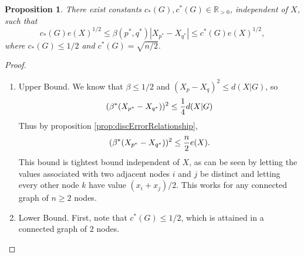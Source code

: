 \documentclass{article}
\newtheorem{proposition}{Proposition}
\theoremstyle{remark}
\newcommand{\R}[0]{\mathbb{R}}
\begin{document}
\begin{proposition}{\label{proposition:errorUpdateEquivalence}}
        There exist constants $c_*(G),c^*(G)\in\R_{>0}$, independent of $X$, such that
        \begin{equation}
		c_*(G)e(X)^{1/2} \leq \beta(p^*,q^*)|X_{p^*}-X_{q^*}| \leq c^*(G)e(X)^{1/2},
        \end{equation}
where $c_*(G)\leq1/2$ and  $c^*(G) = \sqrt{n/2}$.
\end{proposition}
\begin{proof}
        \begin{enumerate}
                \item Upper Bound. We know that $\beta\leq1/2$ and $(X_p-X_q)^2 \leq d(X|G)$, so
                        \begin{equation}{\label{eq:updateSizeBound1}}
                                (\beta^*(X_{p^*}-X_{q^*}))^2\leq \frac{1}{4}d(X|G)
                        \end{equation}
                        Thus by proposition \ref{prop:discErrorRelationship},
                        \begin{equation}{\label{eq:updateSizeBound2}}
                                (\beta^*(X_{p^*}-X_{q^*}))^2 \leq \frac{n}{2}e(X).
                        \end{equation}
                        This bound is tightest bound independent of $X$, as can be seen by letting the values associated with two adjacent nodes $i$ and $j$ be distinct and letting every other node $k$ have value $(x_i+x_j)/2$. This works for any connected graph of $n\geq2$ nodes.
		\item Lower Bound. First, note that $c^*(G)\leq1/2$, which is attained in a connected graph of $2$ nodes.
			

\end{enumerate}
\end{proof}
\end{document}
